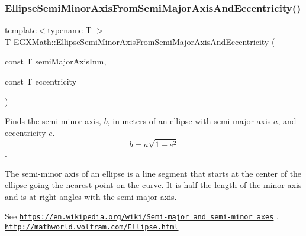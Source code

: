 \subsubsection{\texorpdfstring{Ellipse\+Semi\+Minor\+Axis\+From\+Semi\+Major\+Axis\+And\+Eccentricity()}{EllipseSemiMinorAxisFromSemiMajorAxisAndEccentricity()}}
{\footnotesize\ttfamily template$<$typename T $>$ \\
T E\+G\+X\+Math\+::\+Ellipse\+Semi\+Minor\+Axis\+From\+Semi\+Major\+Axis\+And\+Eccentricity (\begin{DoxyParamCaption}\item[{const T}]{semi\+Major\+Axis\+Inm,  }\item[{const T}]{eccentricity }\end{DoxyParamCaption})}



Finds the semi-\/minor axis, $b$, in meters of an ellipse with semi-\/major axis $a$, and eccentricity $e$. \[ b=a \sqrt{1-e^2} \]. 

The semi-\/minor axis of an ellipse is a line segment that starts at the center of the ellipse going the nearest point on the curve. It is half the length of the minor axis and is at right angles with the semi-\/major axis.

See \href{https://en.wikipedia.org/wiki/Semi-major_and_semi-minor_axes}{\tt https\+://en.\+wikipedia.\+org/wiki/\+Semi-\/major\+\_\+and\+\_\+semi-\/minor\+\_\+axes} , \href{http://mathworld.wolfram.com/Ellipse.html}{\tt http\+://mathworld.\+wolfram.\+com/\+Ellipse.\+html}


